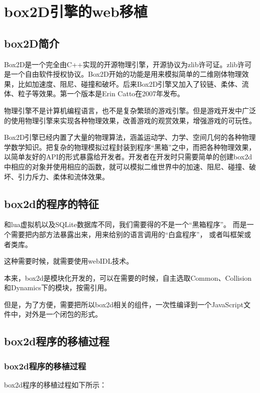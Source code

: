 \chapter{box2D引擎的web移植}

\section{box2D简介}

Box2D是一个完全由C++实现的开源物理引擎，开源协议为zlib许可证。zlib许可是一个自由软件授权协议。Box2D开始的功能是用来模拟简单的二维刚体物理效果，比如加速度、阻尼、碰撞和破坏。后来Box2D引擎又加入了铰链、柔体、流体、粒子等效果。第一个版本是Erin Catto在2007年发布。

物理引擎不是计算机编程语言，也不是复杂繁琐的游戏引擎。但是游戏开发中广泛的使用物理引擎来实现各种物理效果，改善游戏的观赏效果，增强游戏的可玩性。

Box2D引擎已经内置了大量的物理算法，涵盖运动学、力学、空间几何的各种物理学数学知识。把复杂的物理模拟过程封装到程序“黑箱”之中，而把各种物理效果，以简单友好的API的形式暴露给开发者。开发者在开发时只需要简单的创建box2d中相应的对象并使用相应的函数，就可以模拟二维世界中的加速、阻尼、碰撞、破坏、引力斥力、柔体和流体效果。

\section{box2d的程序的特征}

和lua虚拟机以及SQLite数据库不同，我们需要得的不是一个“黑箱程序”。
而是一个需要把内部方法暴露出来，用来给别的语言调用的“白盒程序”，
或者叫框架或者类库。

这种需要时候，就需要使用webIDL技术。

本来，box2d是模块化开发的，可以在需要的时候，自主选取Common、Collision和Dynamics下的模块，按需引用。

但是，为了方便，需要把所以box2d相关的组件，一次性编译到一个JavaScript文件中，对外是一个闭包的形式。

\section{box2d程序的移植过程}

\subsection{box2d程序的移植过程}

box2d程序的移植过程如下所示：


